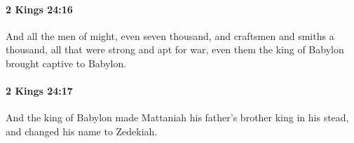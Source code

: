 		\paragraph{2 Kings 24:16} %
			\label{2KINGS-24-16}

			And all the men of might, even seven thousand, and craftsmen and smiths a thousand, all that were strong and apt for war, even them the king of Babylon brought captive to Babylon.


		\paragraph{2 Kings 24:17} %
			\label{2KINGS-24-17}

			And the king of Babylon made Mattaniah his father’s brother king in his stead, and changed his name to Zedekiah.


